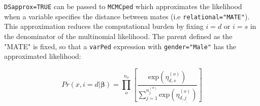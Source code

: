 \documentclass{article}
\begin{document}
\texttt{DSapprox=TRUE} can be passed to \texttt{MCMCped} which approximates the likelihood when a variable specifies the distance between mates (i.e \texttt{relational="MATE"}). This approximation reduces the computational burden by fixing $i=d$ or $i=s$ in the denominator of the multinomial likelihood. The parent defined as the "MATE" is fixed, so that a \texttt{varPed} expression with \texttt{gender="Male"} has the approximated likelihood:

\begin{equation}
Pr(x, i=d|\bm{\beta})  = \prod^{n_{o}}_{o}\left[\frac{\textrm{exp}(\eta^{(o)}_{d,s})}{\sum^{n^{(o)}_{j}}_{j=1}\textrm{exp}(\eta^{(o)}_{d,j})}\right]
\end{equation}





\end{document}
